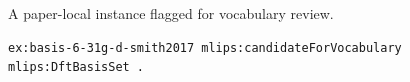 A paper-local instance flagged for vocabulary review.
\begin{lstlisting}[language=turtle]
ex:basis-6-31g-d-smith2017 mlips:candidateForVocabulary mlips:DftBasisSet .
\end{lstlisting}
